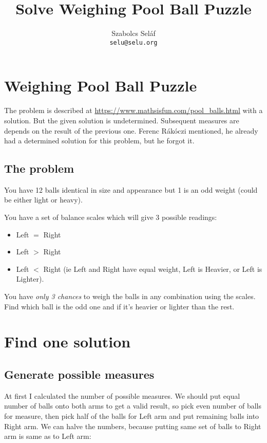 \documentclass[11pt]{article} %
\title{Solve Weighing Pool Ball Puzzle}
\author{Szabolcs Seláf \\ \texttt{selu@selu.org}}
\begin{document}
\maketitle

\section{Weighing Pool Ball Puzzle}

The problem is described at \url{https://www.mathsisfun.com/pool_balls.html} with a solution. But the given solution is undetermined. Subsequent measures are depends on the result of the previous one. Ferenc Rákóczi mentioned, he already had a determined solution for this problem, but he forgot it.

\subsection{The problem}

You have 12 balls identical in size and appearance but 1 is an odd weight (could be either light or heavy).

You have a set of balance scales which will give 3 possible readings:

\begin{itemize}
\item Left $=$ Right
\item Left $>$ Right
\item Left $<$ Right (ie Left and Right have equal weight, Left is Heavier, or Left is Lighter).
\end{itemize}

You have \emph{only 3 chances} to weigh the balls in any combination using the scales.
Find which ball is the odd one and if it's heavier or lighter than the rest.

\section{Find one solution}

\subsection{Generate possible measures} \label{one_solution}

At first I calculated the number of possible measures. We should put equal number of balls onto both arms to get a valid result, so pick even number of balls for measure, then pick half of the balls for Left arm and put remaining balls into Right arm. We can halve the numbers, because putting same set of balls to Right arm is same as to Left arm:
\end{document}
